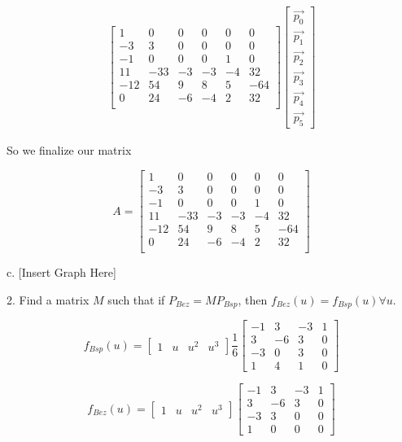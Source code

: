 \documentclass{letter}
\begin{document}
\begin{align*}
\begin{bmatrix}
1 & 0 & 0 & 0 & 0 & 0 \\
-3 & 3 & 0 & 0 & 0 & 0 \\
-1 & 0 & 0 & 0 & 1 & 0 \\
11 & -33 & -3 & -3 & -4 & 32 \\
-12 & 54 & 9 & 8 & 5 & -64 \\
0 & 24 & -6 & -4 & 2 & 32 \\
\end{bmatrix}
\begin{bmatrix}
\vec{p_0} \\
\vec{p_1} \\
\vec{p_2} \\
\vec{p_3} \\
\vec{p_4} \\
\vec{p_5} 
\end{bmatrix}
\end{align*}

So we finalize our matrix

$$A = 
\begin{bmatrix}
1 & 0 & 0 & 0 & 0 & 0 \\
-3 & 3 & 0 & 0 & 0 & 0 \\
-1 & 0 & 0 & 0 & 1 & 0 \\
11 & -33 & -3 & -3 & -4 & 32 \\
-12 & 54 & 9 & 8 & 5 & -64 \\
0 & 24 & -6 & -4 & 2 & 32 \\
\end{bmatrix}
$$

c. [Insert Graph Here]

2. Find a matrix $M$ such that if $P_{Bez} = MP_{Bsp}$, then $f_{Bez}(u) = f_{Bsp}(u) \forall u$. 

$$f_{Bsp}(u) = 
\begin{bmatrix}
1 &
u &
u^2 &
u^3
\end{bmatrix}
\frac{1}{6}
\begin{bmatrix}
-1 & 3 & -3 & 1 \\
3 & -6 & 3 & 0 \\
-3 & 0 & 3 & 0 \\
1 & 4 & 1 & 0 
\end{bmatrix}
$$

$$f_{Bez}(u) = 
\begin{bmatrix}
1 &
u &
u^2 &
u^3
\end{bmatrix}
\begin{bmatrix}
-1 & 3 & -3 & 1 \\
3 & -6 & 3 & 0 \\
-3 & 3 & 0 & 0 \\
1 & 0 & 0 & 0 
\end{bmatrix}
$$
\end{document}
